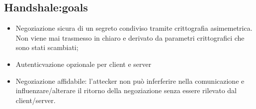 \documentclass{article}
\theoremstyle{remark}
\begin{document}
\subsection{Handshale:goals}
\begin{itemize}
    \item Negoziazione sicura di un segreto condiviso tramite crittografia asimemetrica. Non viene mai trasmesso in chiaro e derivato
    da parametri crittografici che sono stati scambiati;
    \item Autenticvazione opzionale per client e server
    \item Negoziazione affidabile: l'attecker non può inferferire nella comunicazione e influenzare/alterare il ritorno della negoziazione senza essere rilevato dal client/server.
\end{itemize}
\end{document}
